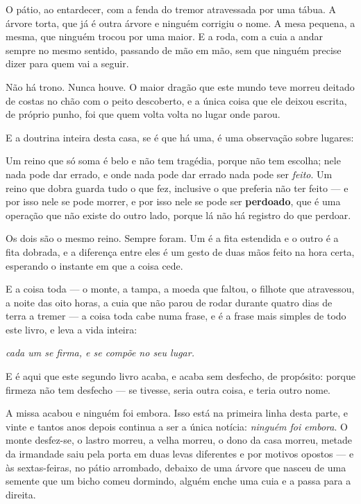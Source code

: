\documentclass[livro.tex]{subfiles}
\begin{document}
\medskip

O pátio, ao entardecer, com a fenda do tremor atravessada por uma tábua. A árvore torta, que já é
outra árvore e ninguém corrigiu o nome. A mesa pequena, a mesma, que ninguém trocou por uma
maior. E a roda, com a cuia a andar sempre no mesmo sentido, passando de mão em mão, sem que
ninguém precise dizer para quem vai a seguir.

Não há trono. Nunca houve. O maior dragão que este mundo teve morreu deitado de costas no chão
com o peito descoberto, e a única coisa que ele deixou escrita, de próprio punho, foi que quem
volta volta no lugar onde parou.

\medskip

E a doutrina inteira desta casa, se é que há uma, é uma observação sobre lugares:

Um reino que só soma é belo e não tem tragédia, porque não tem escolha; nele nada pode dar
errado, e onde nada pode dar errado nada pode ser \emph{feito}. Um reino que dobra guarda tudo o
que fez, inclusive o que preferia não ter feito --- e por isso nele se pode morrer, e por isso
nele se pode ser \textbf{perdoado}, que é uma operação que não existe do outro lado, porque lá
não há registro do que perdoar.

Os dois são o mesmo reino. Sempre foram. Um é a fita estendida e o outro é a fita dobrada, e a
diferença entre eles é um gesto de duas mãos feito na hora certa, esperando o instante em que a
coisa cede.

E a coisa toda --- o monte, a tampa, a moeda que faltou, o filhote que atravessou, a noite das
oito horas, a cuia que não parou de rodar durante quatro dias de terra a tremer --- a coisa toda
cabe numa frase, e é a frase mais simples de todo este livro, e leva a vida inteira:

\medskip

\begin{center}
\emph{cada um se firma, e se compõe no seu lugar.}
\end{center}

\medskip

E é aqui que este segundo livro acaba, e acaba sem desfecho, de propósito: porque firmeza não
tem desfecho --- se tivesse, seria outra coisa, e teria outro nome.

A missa acabou e ninguém foi embora. Isso está na primeira linha desta parte, e vinte e tantos
anos depois continua a ser a única notícia: \emph{ninguém foi embora}. O monte desfez-se, o
lastro morreu, a velha morreu, o dono da casa morreu, metade da irmandade saiu pela porta em
duas levas diferentes e por motivos opostos --- e às sextas-feiras, no pátio arrombado, debaixo
de uma árvore que nasceu de uma semente que um bicho comeu dormindo, alguém enche uma cuia e a
passa para a direita.
\end{document}
